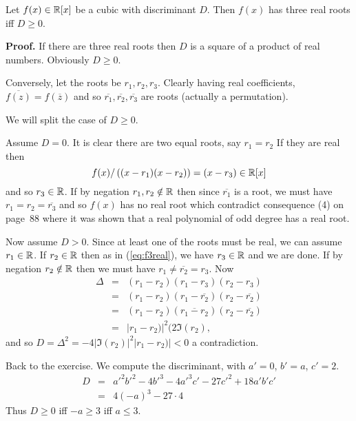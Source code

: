 \begin{myenumerate}
\begin{llem}
Let \(f(x)\in \mathbb{R}[x]\) be a cubic with discriminant $D$.
Then \(f(x)\) has three real roots iff \(D\geq 0\).
\end{llem}
\textbf{Proof.}
If there are three real roots then $D$ is a square
of a product of real numbers. Obviously \(D\geq0\).

Conversely, let the roots be \(r_1,r_2,r_3\).
Clearly having real coefficients, \(\overline{f(z)} = f(\overline{z})\)
and so \(\overline{r_1},\overline{r_2},\overline{r_3}\)
are roots (actually a permutation).

We will split the case of \(D\geq 0\).

Assume \(D = 0\).
It is clear there are two equal roots, say \(r_1=r_2\)
If they are real then
\begin{equation} \label{eq:f3real}
 f(x)/\left((x-r_1)(x-r_2)\right) = (x-r_3) \in \mathbb{R}[x]
\end{equation}
and so \(r_3\in \mathbb{R}\).
If by negation \(r_1,r_2\notin \mathbb{R}\) then since
\(\overline{r_1}\) is a root, we must have
\(r_1 = r_2 = \overline{r_3}\) and so \(f(x)\) has no real root
which contradict
consequence (4)
on page~88 \cite{Rotman98} where it was shown
that a real polynomial of odd degree has a real root.

Now assume \(D > 0\). Since at least one of the roots must be real,
we can assume \(r_1\in \mathbb{R}\).
If \(r_2\in \mathbb{R}\) then as in (\ref{eq:f3real}), we have \(r_3\in \mathbb{R}\)
and we are done. If by negation \(r_2\notin \mathbb{R}\)
then we must have \(r_1 \neq \overline{r_2} = r_3\).
Now
\begin{eqnarray*}
\Delta & = & (r_1 - r_2)(r_1 - r_3)(r_2 - r_3)\\
 & = & (r_1 - r_2)(r_1 - \overline{r_2})(r_2 - \overline{r_2})\\
 & = & (r_1 - r_2)(\overline{r_1 - r_2})(r_2 - \overline{r_2})\\
 & = & |r_1 - r_2)|^2(2\Im(r_2),
\end{eqnarray*}
and so \(D = \Delta^2 = -4|\Im(r_2)|^2|r_1 - r_2)| < 0\) a contradiction.
\proofend

Back to the exercise. We compute the discriminant,
with \(a'=0\), \(b'=a\), \(c'=2\).
\begin{eqnarray*}
D & = & a'^2b'^2 - 4b'^3 - 4a'^3c' - 27c'^2 + 18a'b'c' \\
  & = & 4(-a)^3 - 27\cdot 4
\end{eqnarray*}
Thus \(D\geq 0\) iff \(-a \geq 3\) iff \(a \leq 3\).



\end{myenumerate}
